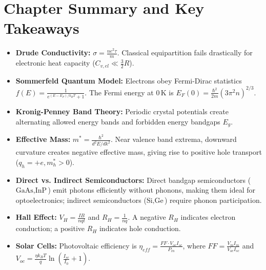 \section{Chapter Summary and Key Takeaways}
\begin{takeawaybox}
\begin{itemize}
    \item \textbf{Drude Conductivity:} $\sigma = \frac{n e^2 \tau}{m}$. Classical equipartition fails drastically for electronic heat capacity ($C_{v,el} \ll \frac{3}{2}R$).
    \item \textbf{Sommerfeld Quantum Model:} Electrons obey Fermi-Dirac statistics $f(E) = \frac{1}{e^{(E-E_F)/k_BT} + 1}$. The Fermi energy at $0\,\text{K}$ is $E_F(0) = \frac{\hbar^2}{2m}(3\pi^2 n)^{2/3}$.
    \item \textbf{Kronig-Penney Band Theory:} Periodic crystal potentials create alternating allowed energy bands and forbidden energy bandgaps $E_g$.
    \item \textbf{Effective Mass:} $m^* = \frac{\hbar^2}{d^2E/dk^2}$. Near valence band extrema, downward curvature creates negative effective mass, giving rise to positive hole transport ($q_h = +e, m_h^* > 0$).
    \item \textbf{Direct vs. Indirect Semiconductors:} Direct bandgap semiconductors ($\text{GaAs}, \text{InP}$) emit photons efficiently without phonons, making them ideal for optoelectronics; indirect semiconductors ($\text{Si}, \text{Ge}$) require phonon participation.
    \item \textbf{Hall Effect:} $V_H = \frac{IB}{nqt}$ and $R_H = \frac{1}{nq}$. A negative $R_H$ indicates electron conduction; a positive $R_H$ indicates hole conduction.
    \item \textbf{Solar Cells:} Photovoltaic efficiency is $\eta_{eff} = \frac{FF \cdot V_{oc} I_{sc}}{P_{in}}$, where $FF = \frac{V_m I_m}{V_{oc} I_{sc}}$ and $V_{oc} = \frac{\eta k_BT}{q}\ln\left(\frac{I_{sc}}{I_0} + 1\right)$.
\end{itemize}
\end{takeawaybox}

